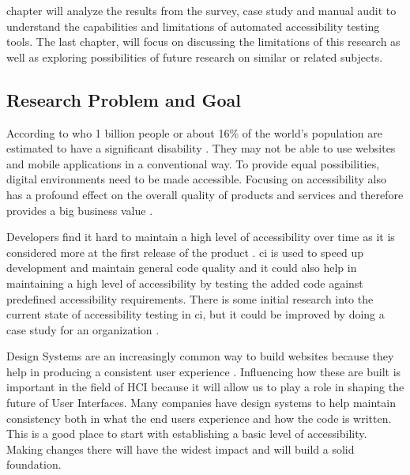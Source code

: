 \documentclass{master_thesis}
\begin{document}
 chapter will analyze the results from the survey, case study and manual audit to understand the capabilities and limitations of automated accessibility testing tools. The last chapter,  will focus on discussing the limitations of this research as well as exploring possibilities of future research on similar or related subjects.

\subsection{Research Problem and Goal}


According to \ac{who} 1 billion people or about 16\% of the world's population are estimated to have a significant disability \citep{WHO2022}. They may not be able to use websites and mobile applications in a conventional way. To provide equal possibilities, digital environments need to be made accessible. Focusing on accessibility also has a profound effect on the overall quality of products and services and therefore provides a big business value \citep{Miesenberger2020}.

Developers find it hard to maintain a high level of accessibility over time as it is considered more at the first release of the product \citep{Paterno2020}. \ac{ci} is used to speed up development and maintain general code quality \citep{Zhao2017} and it could also help in maintaining a high level of accessibility by testing the added code against predefined accessibility requirements. There is some initial research into the current state of accessibility testing in \ac{ci}, but it could be improved by doing a case study for an organization \citep{Sane2021, KelseyAdkins2022}.

Design Systems are an increasingly common way to build websites because they help in producing a consistent user experience \citep{Yew2020}. Influencing how these are built is important in the field of HCI because it will allow us to play a role in shaping the future of User Interfaces. Many companies have design systems to help maintain consistency both in what the end users experience and how the code is written. This is a good place to start with establishing a basic level of accessibility. Making changes there will have the widest impact and will build a solid foundation.
\end{document}
